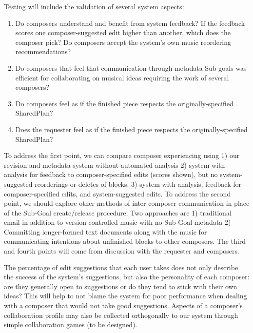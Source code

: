 \documentclass[final,authoryear,5p,times,twocolumn]{elsarticle}
\begin{document}
Testing will include the validation of several system aspects:

\begin{enumerate}

\item Do composers understand and benefit from system feedback? If the feedback scores one composer-suggested edit higher than another, which does the composer pick? Do composers accept the system's own music reordering recommendations?

\item Do composers that feel that communication through metadata Sub-goals was efficient for collaborating on musical ideas requiring the work of several composers?

\item Do composers feel as if the finished piece respects the originally-specified SharedPlan?

\item Does the requester feel as if the finished piece respects the originally-specified SharedPlan?

\end{enumerate}

To address the first point, we can compare composer experiencing using 1) our revision and metadata system without automated analysis 2) system with analysis for feedback to composer-specified edits (scores shown), but no system-suggested reorderings or deletes of blocks. 3) system with analysis, feedback for composer-specified edits, and system-suggested edits. To address the second point, we should explore other methods of inter-composer communication in place of the Sub-Goal create/release procedure. Two approaches are 1) traditional email in addition to version controlled music with no Sub-Goal metadata 2) Committing longer-formed text documents along with the music for communicating intentions about unfinished blocks to other composers. The third and fourth points will come from discussion with the requester and composers.

The percentage of edit suggestions that each user takes does not only describe the success of the system's suggestions, but also the personality of each composer: are they generally open to suggestions or do they tend to stick with their own ideas? This will help to not blame the system for poor performance when dealing with a composer that would not take good suggestions. Aspects of a composer's collaboration profile may also be collected orthogonally to our system through simple collaboration games (to be designed).
\end{document}
